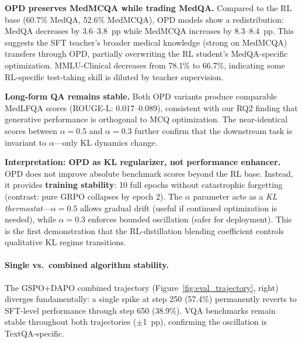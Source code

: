\documentclass{article}
\begin{document}
\textbf{OPD preserves MedMCQA while trading MedQA.} Compared to the RL base (60.7\% MedQA, 52.6\% MedMCQA), OPD models show a redistribution: MedQA decreases by 3.6--3.8~pp while MedMCQA increases by 8.3--8.4~pp. This suggests the SFT teacher's broader medical knowledge (strong on MedMCQA) transfers through OPD, partially overwriting the RL student's MedQA-specific optimization. MMLU-Clinical decreases from 78.1\% to 66.7\%, indicating some RL-specific test-taking skill is diluted by teacher supervision.

\textbf{Long-form QA remains stable.} Both OPD variants produce comparable MedLFQA scores (ROUGE-L: 0.017--0.089), consistent with our RQ2 finding that generative performance is orthogonal to MCQ optimization. The near-identical scores between $\alpha=0.5$ and $\alpha=0.3$ further confirm that the downstream task is invariant to $\alpha$---only KL dynamics change.

\textbf{Interpretation: OPD as KL regularizer, not performance enhancer.} OPD does not improve absolute benchmark scores beyond the RL base. Instead, it provides \textbf{training stability}: 10 full epochs without catastrophic forgetting (contrast: pure GRPO collapses by epoch 2). The $\alpha$ parameter acts as a \emph{KL thermostat}---$\alpha=0.5$ allows gradual drift (useful if continued optimization is needed), while $\alpha=0.3$ enforces bounded oscillation (safer for deployment). This is the first demonstration that the RL-distillation blending coefficient controls qualitative KL regime transitions.

\paragraph{Single vs.\ combined algorithm stability.} The GSPO+DAPO combined trajectory (Figure~\ref{fig:eval_trajectory}, right) diverges fundamentally: a single spike at step 250 (57.4\%) permanently reverts to SFT-level performance through step 650 (38.9\%). VQA benchmarks remain stable throughout both trajectories ($\pm$1~pp), confirming the oscillation is TextQA-specific.
\end{document}
